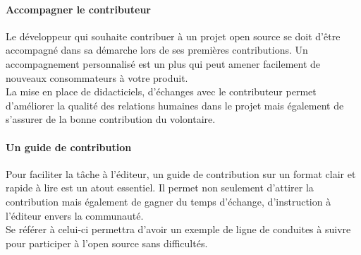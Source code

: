 	\paragraph{Accompagner le contributeur\\}

	Le développeur qui souhaite contribuer à un projet open source se doit d'être accompagné dans sa démarche lors de ses premières contributions. Un accompagnement personnalisé est un plus qui peut amener facilement de nouveaux consommateurs à votre produit.\\

	La mise en place de didacticiels, d'échanges avec le contributeur permet d'améliorer la qualité des relations humaines dans le projet mais également de s'assurer de la bonne contribution du volontaire.

	\paragraph{Un guide de contribution\\}

	Pour faciliter la tâche à l'éditeur, un guide de contribution sur un format clair et rapide à lire est un atout essentiel.
	Il permet non seulement d'attirer la contribution mais également de gagner du temps d'échange, d'instruction à l'éditeur envers la communauté.\\

	Se référer à celui-ci permettra d'avoir un exemple de ligne de conduites à suivre pour participer à l'open source sans difficultés.
